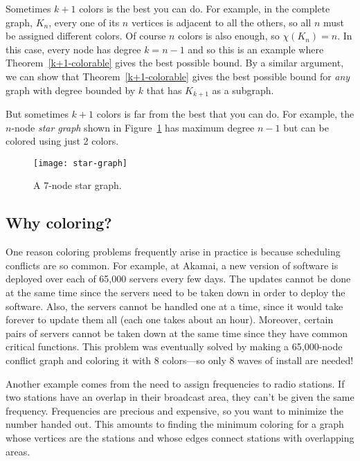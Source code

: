 Sometimes $k+1$ colors is the best you can do.  For example, in the
complete graph, $K_n$, every one of its $n$ vertices is adjacent to
all the others, so all $n$ must be assigned different colors.  Of
course $n$ colors is also enough, so $\chi(K_n)=n$.  In this case,
every node has degree $k = n - 1$ and so this is an example where
Theorem~\ref{k+1-colorable} gives the best possible bound.  By a
similar argument, we can show that Theorem~\ref{k+1-colorable} gives
the best possible bound for \emph{any} graph with degree bounded by
$k$ that has $K_{k+1}$ as a subgraph.

But sometimes $k+1$ colors is far from the best that you can do.
For example, the $n$-node \emph{star graph} shown in
Figure~\ref{fig:5T} has maximum degree $n - 1$ but can be colored
using just 2 colors.

\begin{figure}\redrawn

\texttt{[image: star-graph]}

\caption{A 7-node star graph.}

\label{fig:5T}

\end{figure}


\subsection{Why coloring?}

One reason coloring problems frequently arise in practice is because
scheduling conflicts are so common.  For example, at Akamai, a new
version of software is deployed over each of 65,000 servers every few
days.  The updates cannot be done at the same time since the servers
need to be taken down in order to deploy the software.  Also, the
servers cannot be handled one at a time, since it would take forever
to update them all (each one takes about an hour).  Moreover, certain
pairs of servers cannot be taken down at the same time since they have
common critical functions.  This problem was eventually solved by
making a 65,000-node conflict graph and coloring it with 8 colors---so
only 8 waves of install are needed!

Another example comes from the need to assign frequencies to radio
stations.  If two stations have an overlap in their broadcast area, they
can't be given the same frequency.  Frequencies are precious and
expensive, so you want to minimize the number handed out.  This amounts to
finding the minimum coloring for a graph whose vertices are the stations
and whose edges connect stations with overlapping areas.

